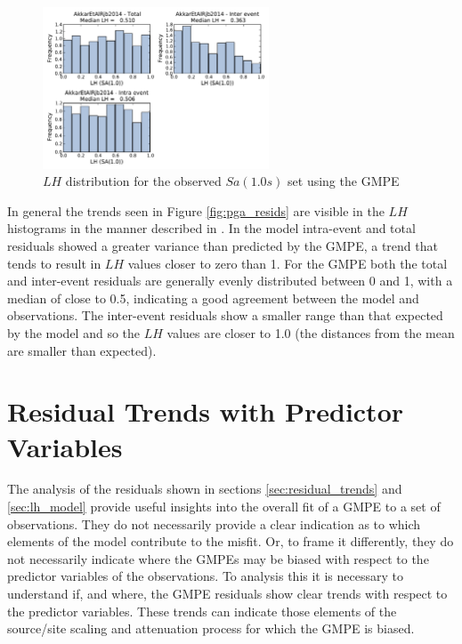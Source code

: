 \begin{figure}[htb]
	\centering
		\includegraphics[width=0.6\textwidth]{./figures/residuals/Akkar2014_LH_Sa1.pdf}
	\caption{$LH$ distribution for the observed $Sa \left( {1.0 s} \right)$ set using the \textcite{Akkar_etal2014} GMPE}
	\label{fig:sa1_lh_akkar2014}
\end{figure}

In general the trends seen in Figure \ref{fig:pga_resids} are visible in the $LH$ histograms in the manner described in \textcite{Scherbaum_etal2004}. In the \textcite{boore2008} model intra-event and total residuals showed a greater variance than predicted by the GMPE, a trend that tends to result in $LH$ values closer to zero than 1. For the \textcite{Akkar_etal2014} GMPE both the total and inter-event residuals are generally evenly distributed between 0 and 1, with a median of close to 0.5, indicating a good agreement between the model and observations. The inter-event residuals show a smaller range than that expected by the model and so the $LH$ values are closer to 1.0 (the distances from the mean are smaller than expected). 

\section{Residual Trends with Predictor Variables}
\label{sec:predictor_trends}

The analysis of the residuals shown in sections \ref{sec:residual_trends} and \ref{sec:lh_model} provide useful insights into the overall fit of a GMPE to a set of observations. They do not necessarily provide a clear indication as to which elements of the model contribute to the misfit. Or, to frame it differently, they do not necessarily indicate where the GMPEs may be biased with respect to the predictor variables of the observations. To analysis this it is necessary to understand if, and where, the GMPE residuals show clear trends with respect to the predictor variables. These trends can indicate those elements of the source/site scaling and attenuation process for which the GMPE is biased.

